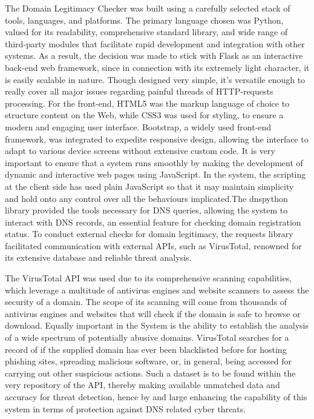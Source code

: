 The Domain Legitimacy Checker was built using a carefully selected stack of tools, languages, and platforms. The primary language chosen was Python, valued for its readability, comprehensive standard library, and wide range of third-party modules that facilitate rapid development and integration with other systems. As a result, the decision was made to stick with Flask as an interactive back-end web framework, since in connection with its extremely light character, it is easily scalable in nature. Though designed very simple, it's versatile enough to really cover all major issues regarding painful threads of HTTP-requests processing. For the front-end, HTML5 was the markup language of choice to structure content on the Web, while CSS3 was used for styling, to ensure a modern and engaging user interface. Bootstrap, a widely used front-end framework, was integrated to expedite responsive design, allowing the interface to adapt to various device screens without extensive custom code. It is very important to ensure that a system runs smoothly by making the development of dynamic and interactive web pages using JavaScript. In the system, the scripting at the client side has used plain JavaScript so that it may maintain simplicity and hold onto any control over all the behaviours implicated.The dnspython library provided the tools necessary for DNS queries, allowing the system to interact with DNS records, an essential feature for checking domain registration status. To conduct external checks for domain legitimacy, the requests library facilitated communication with external APIs, such as VirusTotal, renowned for its extensive database and reliable threat analysis. 

The VirusTotal API was used due to its comprehensive scanning capabilities, which leverage a multitude of antivirus engines and website scanners to assess the security of a domain. The scope of its scanning will come from thousands of antivirus engines and websites that will check if the domain is safe to browse or download. Equally important in the System is the ability to establish the analysis of a wide spectrum of potentially abusive domains. VirusTotal searches for a record of if the supplied domain has ever been blacklisted before for hosting phishing sites, spreading malicious software, or, in general, being accessed for carrying out other suspicious actions. Such a dataset is to be found within the very repository of the API, thereby making available unmatched data and accuracy for threat detection, hence by and large enhancing the capability of this system in terms of protection against DNS related cyber threats.


